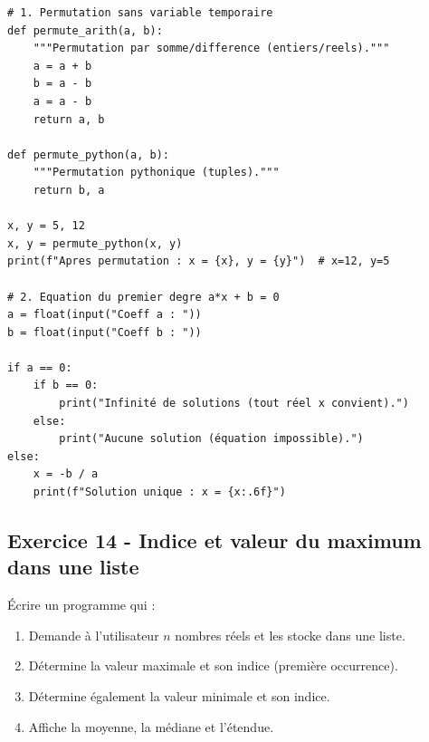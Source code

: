 \documentclass[12pt,a4paper]{article}
\begin{document}
\begin{boitecorrige}
\begin{lstlisting}
# 1. Permutation sans variable temporaire
def permute_arith(a, b):
    """Permutation par somme/difference (entiers/reels)."""
    a = a + b
    b = a - b
    a = a - b
    return a, b

def permute_python(a, b):
    """Permutation pythonique (tuples)."""
    return b, a

x, y = 5, 12
x, y = permute_python(x, y)
print(f"Apres permutation : x = {x}, y = {y}")  # x=12, y=5

# 2. Equation du premier degre a*x + b = 0
a = float(input("Coeff a : "))
b = float(input("Coeff b : "))

if a == 0:
    if b == 0:
        print("Infinité de solutions (tout réel x convient).")
    else:
        print("Aucune solution (équation impossible).")
else:
    x = -b / a
    print(f"Solution unique : x = {x:.6f}")
\end{lstlisting}

\end{boitecorrige}

\subsection*{Exercice 14 - Indice et valeur du maximum dans une liste \niveau{\facile}}

\begin{boiteexercice}
Écrire un programme qui :
\begin{enumerate}
  \item Demande à l'utilisateur $n$ nombres réels et les stocke dans une liste.
  \item Détermine la valeur maximale et son indice (première occurrence).
  \item Détermine également la valeur minimale et son indice.
  \item Affiche la moyenne, la médiane et l'étendue.
\end{enumerate}
\end{boiteexercice}
\end{document}
